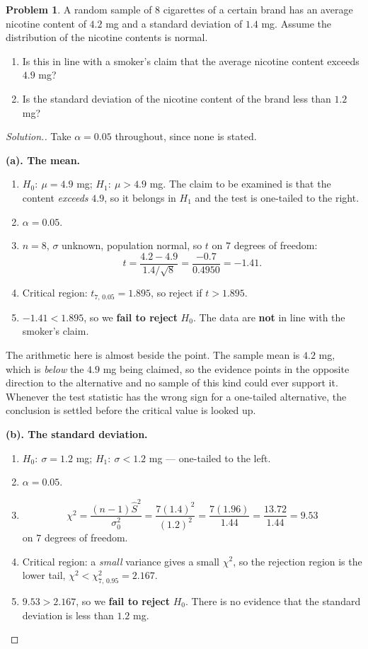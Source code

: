\documentclass[11pt,a4paper]{article}
\theoremstyle{definition}
\newtheorem{problemx}{Problem}[section]
\newenvironment{problem}{\begin{problemx}}{\end{problemx}}
\newenvironment{solution}
  {\renewcommand{\qedsymbol}{}\begin{proof}[\textit{Solution}.]}
  {\end{proof}}
\begin{document}
\begin{problem}
A random sample of $8$ cigarettes of a certain brand has an average nicotine content of
$4.2$ mg and a standard deviation of $1.4$ mg. Assume the distribution of the nicotine
contents is normal.
\begin{enumerate}
\item[(a).] Is this in line with a smoker's claim that the average nicotine content exceeds
$4.9$ mg?
\item[(b).] Is the standard deviation of the nicotine content of the brand less than
$1.2$ mg?
\end{enumerate}
\end{problem}

\begin{solution}
Take $\alpha=0.05$ throughout, since none is stated.

\textbf{(a). The mean.}
\begin{enumerate}
\item $H_0:\ \mu=4.9$ mg; $H_1:\ \mu>4.9$ mg. The claim to be examined is that the content
\emph{exceeds} $4.9$, so it belongs in $H_1$ and the test is one-tailed to the right.
\item $\alpha=0.05$.
\item $n=8$, $\sigma$ unknown, population normal, so $t$ on $7$ degrees of freedom:
\[t=\frac{4.2-4.9}{1.4/\sqrt{8}}=\frac{-0.7}{0.4950}=-1.41.\]
\item Critical region: $t_{7,\,0.05}=1.895$, so reject if $t>1.895$.
\item $-1.41<1.895$, so we \textbf{fail to reject} $H_0$. The data are \textbf{not} in line
with the smoker's claim.
\end{enumerate}

The arithmetic here is almost beside the point. The sample mean is $4.2$ mg, which is
\emph{below} the $4.9$ mg being claimed, so the evidence points in the opposite direction to
the alternative and no sample of this kind could ever support it. Whenever the test
statistic has the wrong sign for a one-tailed alternative, the conclusion is settled before
the critical value is looked up.

\textbf{(b). The standard deviation.}
\begin{enumerate}
\item $H_0:\ \sigma=1.2$ mg; $H_1:\ \sigma<1.2$ mg --- one-tailed to the left.
\item $\alpha=0.05$.
\item
\[\chi^2=\frac{(n-1)\hat{S}^2}{\sigma_0^2}=\frac{7(1.4)^2}{(1.2)^2}
=\frac{7(1.96)}{1.44}=\frac{13.72}{1.44}=9.53\]
on $7$ degrees of freedom.
\item Critical region: a \emph{small} variance gives a small $\chi^2$, so the rejection
region is the lower tail, $\chi^2<\chi^2_{7,\,0.95}=2.167$.
\item $9.53>2.167$, so we \textbf{fail to reject} $H_0$. There is no evidence that the
standard deviation is less than $1.2$ mg.
\end{enumerate}


\end{solution}
\end{document}

